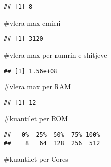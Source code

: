 \documentclass[
]{article}
\newenvironment{Shaded}{\begin{snugshade}}{\end{snugshade}}
\newcommand{\FunctionTok}[1]{\textcolor[rgb]{0.00,0.00,0.00}{#1}}
\newcommand{\NormalTok}[1]{#1}
\newcommand{\SpecialCharTok}[1]{\textcolor[rgb]{0.00,0.00,0.00}{#1}}
\begin{document}
\begin{verbatim}
## [1] 8
\end{verbatim}

\#vlera max cmimi

\begin{Shaded}
\end{Shaded}

\begin{verbatim}
## [1] 3120
\end{verbatim}

\#vlera max per numrin e shitjeve

\begin{Shaded}
\end{Shaded}

\begin{verbatim}
## [1] 1.56e+08
\end{verbatim}

\#vlera max per RAM

\begin{Shaded}
\end{Shaded}

\begin{verbatim}
## [1] 12
\end{verbatim}

\#kuantilet per ROM

\begin{Shaded}
\end{Shaded}

\begin{verbatim}
##   0%  25%  50%  75% 100% 
##    8   64  128  256  512
\end{verbatim}

\#kuantilet per Cores

\begin{Shaded}
\end{Shaded}
\end{document}
